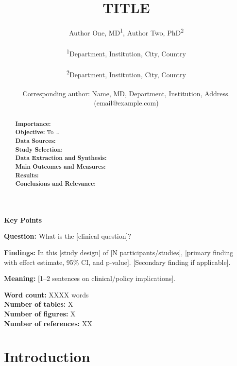 \documentclass[12pt,a4paper]{article}
\title{\textbf{TITLE}}
\author{
  Author One, MD\textsuperscript{1},
  Author Two, PhD\textsuperscript{2} \\\\
  \small\textsuperscript{1}Department, Institution, City, Country \\\\
  \small\textsuperscript{2}Department, Institution, City, Country \\\\
  \small Corresponding author: Name, MD, Department, Institution, Address. (email@example.com)
}
\date{}
\begin{document}
\maketitle

\begin{framed}
\noindent\textbf{Key Points}

\textbf{Question:} What is the [clinical question]?

\textbf{Findings:} In this [study design] of [N participants/studies], [primary finding with effect estimate, 95\% CI, and p-value]. [Secondary finding if applicable].

\textbf{Meaning:} [1--2 sentences on clinical/policy implications].
\end{framed}

\vspace{1em}

\noindent\textbf{Word count:} XXXX words \\
\textbf{Number of tables:} X \\
\textbf{Number of figures:} X \\
\textbf{Number of references:} XX

\newpage

\begin{abstract}
\noindent\textbf{Importance:} \\[0.5em]
\textbf{Objective:} To \ldots \\[0.5em]
\textbf{Data Sources:} \\[0.5em]
\textbf{Study Selection:} \\[0.5em]
\textbf{Data Extraction and Synthesis:} \\[0.5em]
\textbf{Main Outcomes and Measures:} \\[0.5em]
\textbf{Results:} \\[0.5em]
\textbf{Conclusions and Relevance:}
\end{abstract}

\newpage

\section{Introduction}
\end{document}
